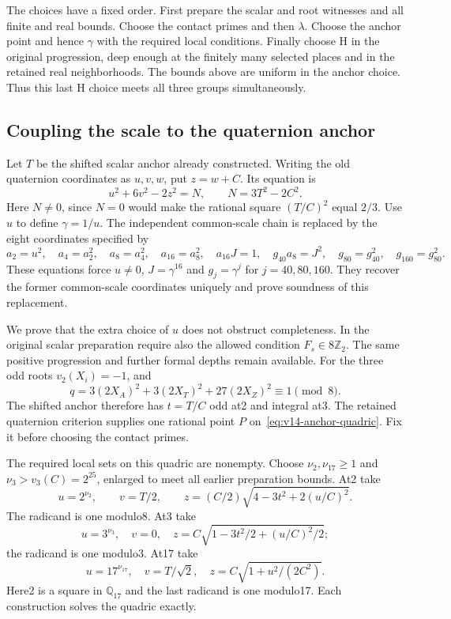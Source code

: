 The choices have a fixed order. First prepare the scalar and
root witnesses and all finite and real bounds. Choose the
contact primes and then $\lambda$. Choose the anchor point
and hence $\gamma$ with the required local conditions.
Finally choose H in the original progression, deep enough at
the finitely many selected places and in the retained real
neighborhoods. The bounds above are uniform in the anchor
choice. Thus this last H choice meets all three groups
simultaneously.

\subsection{Coupling the scale to the quaternion anchor}
\label{subsec:v14-anchor}
Let $T$ be the shifted scalar anchor already constructed.
Writing the old quaternion coordinates as $u,v,w$, put
$z=w+C$. Its equation is
\begin{equation}\label{eq:v14-anchor-quadric}
 u^2+6v^2-2z^2=N,\qquad N=3T^2-2C^2.
\end{equation}
Here $N\ne0$, since $N=0$ would make the rational square
$(T/C)^2$ equal $2/3$.
Use $u$ to define $\gamma=1/u$. The independent common-scale
chain is replaced by the eight coordinates specified by
\[
 a_2=u^2,\quad a_4=a_2^2,\quad a_8=a_4^2,\quad
 a_{16}=a_8^2,\quad a_{16}J=1,\quad
 g_{40}a_8=J^2,\quad g_{80}=g_{40}^2,\quad
 g_{160}=g_{80}^2.
\]
These equations force $u\ne0$, $J=\gamma^{16}$ and
$g_j=\gamma^j$ for $j=40,80,160$. They recover the former
common-scale coordinates uniquely and prove soundness of
this replacement.

We prove that the extra choice of $u$ does not obstruct
completeness. In the original scalar preparation require also
the allowed condition $F_s\in8\mathbb Z_2$. The same positive
progression and further formal depths remain available.
For the three odd roots $v_2(X_i)=-1$, and
\[
 q=3(2X_A)^2+3(2X_T)^2+27(2X_Z)^2\equiv1\pmod8.
\]
The shifted anchor therefore has $t=T/C$ odd at2 and integral
at3. The retained quaternion criterion supplies one rational
point $P$ on~\eqref{eq:v14-anchor-quadric}.
Fix it before choosing the contact primes.

The required local sets on this quadric are nonempty. Choose
$\nu_2,\nu_{17}\geq1$ and
$\nu_3>v_3(C)=2^{25}$, enlarged to meet all earlier preparation
bounds. At2 take
\[
 u=2^{\nu_2},\qquad v=T/2,\qquad
 z=(C/2)\sqrt{4-3t^2+2(u/C)^2}.
\]
The radicand is one modulo8. At3 take
\[
 u=3^{\nu_3},\quad v=0,\quad
 z=C\sqrt{1-3t^2/2+(u/C)^2/2};
\]
the radicand is one modulo3. At17 take
\[
 u=17^{\nu_{17}},\quad v=T/\sqrt2,\quad
 z=C\sqrt{1+u^2/(2C^2)}.
\]
Here2 is a square in $\mathbb Q_{17}$ and the last radicand
is one modulo17. Each construction solves the quadric exactly.

